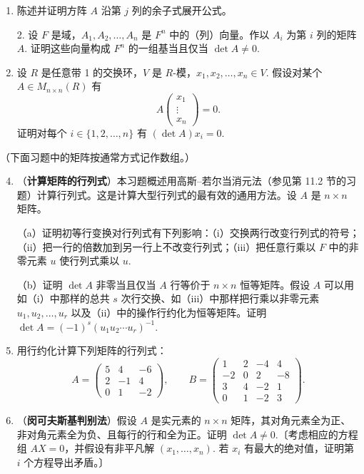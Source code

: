 \begin{enumerate}
\item 陈述并证明方阵 \(A\) 沿第 \(j\) 列的余子式展开公式。

2. 设 \(F\) 是域，\(A_1, A_2, \ldots, A_n\) 是 \(F^n\) 中的（列）向量。作以 \(A_i\) 为第 \(i\) 列的矩阵 \(A\). 证明这些向量构成 \(F^n\) 的一组基当且仅当 \(\det A \neq 0\).

\item 设 \(R\) 是任意带 1 的交换环，\(V\) 是 \(R\)-模，\(x_1, x_2, \ldots, x_n \in V\). 假设对某个 \(A \in M_{n \times n}(R)\) 有
\[
A\begin{pmatrix} x_1 \\ \vdots \\ x_n \end{pmatrix} = 0.
\]
证明对每个 \(i \in \{1, 2, \ldots, n\}\) 有 \((\det A)x_i = 0\).
\end{enumerate}

\noindent（下面习题中的矩阵按通常方式记作数组。）

\begin{enumerate}
\setcounter{enumi}{3}
\item （\textbf{计算矩阵的行列式}）本习题概述用高斯--若尔当消元法（参见第 11.2 节的习题）计算行列式。这是计算大型行列式的最有效的通用方法。设 \(A\) 是 \(n \times n\) 矩阵。

（a）证明初等行变换对行列式有下列影响：（i）交换两行改变行列式的符号；（ii）把一行的倍数加到另一行上不改变行列式；（iii）把任意行乘以 \(F\) 中的非零元素 \(u\) 使行列式乘以 \(u\).

（b）证明 \(\det A\) 非零当且仅当 \(A\) 行等价于 \(n \times n\) 恒等矩阵。假设 \(A\) 可以用如（i）中那样的总共 \(s\) 次行交换、如（iii）中那样把行乘以非零元素 \(u_1, u_2, \ldots, u_r\) 以及（ii）中的操作行约化为恒等矩阵。证明 \(\det A = (-1)^s(u_1u_2\cdots u_r)^{-1}\).

\item 用行约化计算下列矩阵的行列式：
\[
A = \begin{pmatrix} 5 & 4 & -6 \\ 2 & -1 & 4 \\ 0 & 1 & -2 \end{pmatrix}, \qquad B = \begin{pmatrix} 1 & 2 & -4 & 4 \\ -2 & 0 & 2 & -8 \\ 3 & 4 & -2 & 1 \\ 0 & 1 & -2 & 3 \end{pmatrix}.
\]

\item （\textbf{闵可夫斯基判别法}）假设 \(A\) 是实元素的 \(n \times n\) 矩阵，其对角元素全为正、非对角元素全为负、且每行的行和全为正。证明 \(\det A \neq 0\).〔考虑相应的方程组 \(AX = 0\)，并假设有非平凡解 \((x_1, \ldots, x_n)\). 若 \(x_i\) 有最大的绝对值，证明第 \(i\) 个方程导出矛盾。〕
\end{enumerate}

